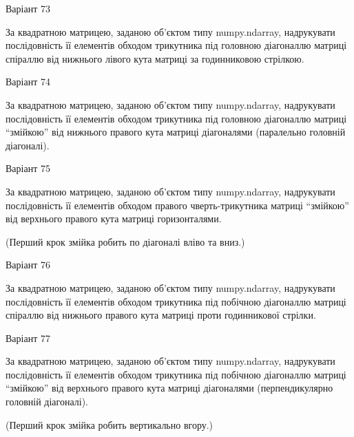 \documentclass[11pt, ukrainian]{article}
\begin{document}
{\Large \center  Варіант  73\par \bigskip\bigskip}

За квадратною матрицею, заданою об'єктом типу numpy.ndarray, надрукувати послідовність її елементів обходом трикутника під головною діагоналлю матриці спіраллю від нижнього лівого кута матриці за годинниковою стрілкою.





{\Large \center  Варіант  74\par \bigskip\bigskip}

За квадратною матрицею, заданою об'єктом типу numpy.ndarray, надрукувати послідовність її елементів обходом трикутника під головною діагоналлю матриці ``змійкою'' від нижнього правого кута матриці діагоналями (паралельно головній діагоналі).





{\Large \center  Варіант  75\par \bigskip\bigskip}

За квадратною матрицею, заданою об'єктом типу numpy.ndarray, надрукувати послідовність її елементів обходом правого чверть-трикутника матриці ``змійкою'' від верхнього правого кута матриці горизонталями.


(Перший крок змійка робить по діагоналі вліво та вниз.)


{\Large \center  Варіант  76\par \bigskip\bigskip}

За квадратною матрицею, заданою об'єктом типу numpy.ndarray, надрукувати послідовність її елементів обходом трикутника під побічною діагоналлю матриці спіраллю від нижнього правого кута матриці проти годинникової стрілки.





{\Large \center  Варіант  77\par \bigskip\bigskip}

За квадратною матрицею, заданою об'єктом типу numpy.ndarray, надрукувати послідовність її елементів обходом трикутника під побічною діагоналлю матриці ``змійкою'' від верхнього правого кута матриці діагоналями (перпендикулярно головній діагоналі).

(Перший крок змійка робить вертикально вгору.)
\end{document}
